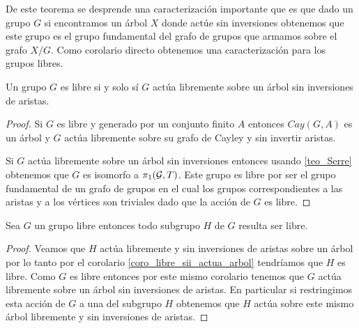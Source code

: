\documentclass[tesis.tex]{subfiles}
\begin{document}
De este teorema se desprende una caracterización importante que es que dado un grupo $G$ si encontramos un árbol $X$ donde actúe sin inversiones obtenemos que este grupo es el grupo fundamental del grafo de grupos que armamos sobre el grafo $X/G$.
Como corolario directo obtenemos una caracterización para los grupos libres.




\begin{coro}\label{coro_libre_sii_actua_arbol}
	Un grupo $G$ es libre si y solo sí $G$ actúa libremente sobre un árbol sin inversiones de aristas. 
\end{coro}

\begin{proof}
	Si $G$ es libre  y generado por un conjunto finito $A$ entonces $Cay(G,A)$ es un árbol y $G$ actúa libremente sobre su grafo de Cayley y sin invertir aristas.
	
	Si $G$ actúa libremente sobre un árbol sin inversiones entonces usando \ref{teo_Serre} obtenemos que $G$ es isomorfo a $\pi_1({\cal G}, T)$.
	Este grupo es libre por ser el grupo fundamental de un grafo de grupos en el cual los grupos correspondientes a las aristas y a los vértices son triviales dado que la acción de $G$ es libre.
	
\end{proof}

\begin{coro}\label{coro_niels_sch}
	Sea $G$ un grupo libre entonces todo subgrupo $H$ de $G$ resulta ser libre.
\end{coro}
\begin{proof} 
	Veamos que $H$ actúa libremente y sin inversiones de aristas sobre un árbol por lo tanto por el corolario \ref{coro_libre_sii_actua_arbol} tendríamos que $H$ es libre.
	Como $G$ es libre entonces por este mismo corolario tenemos que $G$ actúa libremente sobre un árbol sin inversiones de aristas.
	En particular si restringimos esta acción de $G$ a una del subgrupo $H$ obtenemos que $H$ actúa sobre este mismo árbol libremente y sin inversiones de aristas. 
	
\end{proof}

%
%
%
\end{document}
